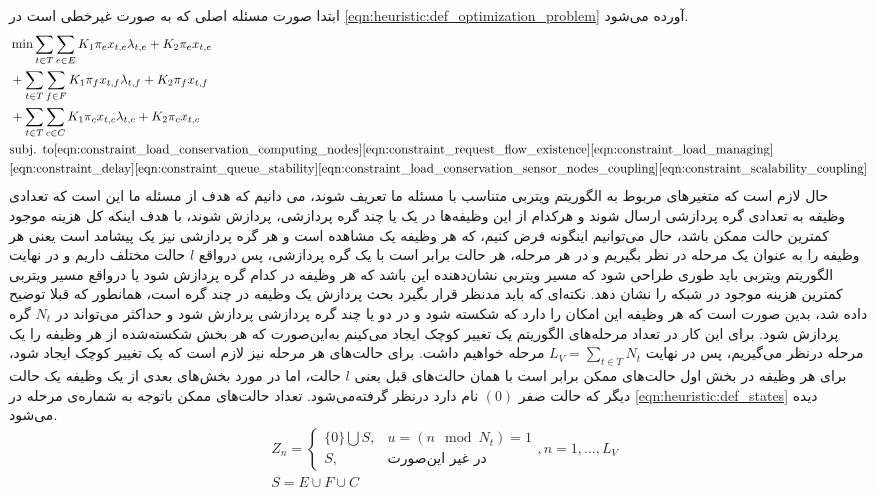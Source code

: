 	ابتدا صورت مسئله اصلی که به صورت غیرخطی است در \cref{eqn:heuristic:def_optimization_problem} آورده می‌شود. 
	\begin{align}\label{eqn:heuristic:def_optimization_problem}
		& \min \sum_{t \in T}\sum_{e \in E} K_1\pi_ex_{t,e}\lambda_{t,e} + K_2\pi_ex_{t,e} \notag \\
		& + \sum_{t \in T}\sum_{f \in F} K_1\pi_fx_{t,f}\lambda_{t,f} + K_2\pi_fx_{t,f} \notag \\
		& + \sum_{t \in T}\sum_{c \in C} K_1\pi_cx_{t,c}\lambda_{t,c} + K_2\pi_cx_{t,c} \notag \\
		&\text{subj. to}  %
		\cref{eqn:constraint_load_conservation_computing_nodes}
		\cref{eqn:constraint_request_flow_existence}
		\cref{eqn:constraint_load_managing}\notag \\
		&\cref{eqn:constraint_delay}
		\cref{eqn:constraint_queue_stability}
		\cref{eqn:constraint_load_conservation_sensor_nodes_coupling}
		\cref{eqn:constraint_scalability_coupling}
	\end{align}
	حال لازم است که متغیرهای مربوط به الگوریتم ویتربی متناسب با مسئله‌ ما تعریف شوند، می دانیم که هدف از مسئله ما این است که تعدادی وظیفه به تعدادی گره پردازشی ارسال شوند و هرکدام از این وظیفه‌ها در یک یا چند گره پردازشی، پردازش شوند، با هدف اینکه کل هزینه موجود کمترین حالت ممکن باشد، حال می‌توانیم اینگونه فرض کنیم، که هر وظیفه یک مشاهده است و هر گره پردازشی نیز یک پیشامد است یعنی هر وظیفه را به عنوان یک مرحله در نظر بگیریم و در هر مرحله، هر حالت برابر است با یک گره پردازشی، پس درواقع $l$ حالت مختلف داریم و در نهایت الگوریتم ویتربی باید طوری طراحی شود که مسیر ویتربی نشان‌دهنده این باشد که هر وظیفه در کدام گره پردازش شود یا درواقع مسیر ویتربی کمترین هزینه موجود در شبکه را نشان دهد.
	نکته‌ای که باید مدنظر قرار بگیرد بحث پردازش یک وظیفه در چند گره است، همانطور که قبلا توضیح داده شد، بدین صورت است که هر وظیفه این امکان را دارد که شکسته شود و در دو یا چند گره پردازشی پردازش شود و حداکثر می‌تواند در $N_t$ گره پردازش شود. 
	برای این کار در تعداد مرحله‌های الگوریتم یک تغییر کوچک ایجاد می‌کینم به‌این‌صورت که هر بخش شکسته‌شده از هر وظیفه را یک مرحله درنظر می‌گیریم، پس در نهایت $ \displaystyle L_V=\sum_{t \in T} N_t$ مرحله خواهیم داشت. 
	برای حالت‌های هر مرحله نیز لازم است که یک تغییر کوچک ایجاد شود، برای هر وظیفه در بخش اول حالت‌های ممکن برابر است با همان حالت‌های قبل یعنی $l$ حالت، اما در مورد بخش‌های بعدی از یک وظیفه یک حالت دیگر که حالت صفر $(0)$ نام دارد درنظر گرفته‌می‌شود. تعداد حالت‌های ممکن باتوجه به شماره‌ی مرحله در \cref{eqn:heuristic:def_states} دیده می‌شود. 
	\begin{subequations}\label{eqn:heuristic:def_states}
		\begin{align}
			&Z_n =
			\begin{cases}
			\{0\} \bigcup S, & \text{$u = (n \mod N_t) = 1$} \\
			S,               & \text{در غیر این‌صورت}
			\end{cases}
			,n = 1, \dots, L_V \\
			&S = E \cup F \cup C
		\end{align}
	\end{subequations}
